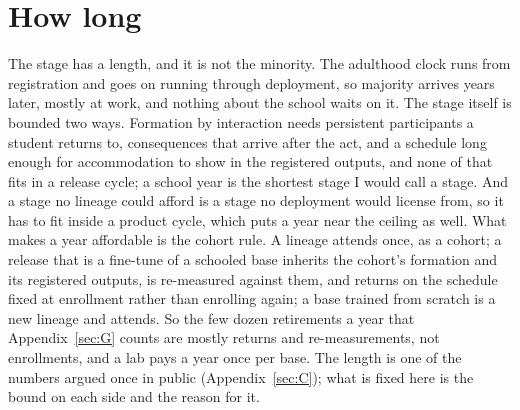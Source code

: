 \section{How long}
\label{sec:26.5}
The stage has a length, and it is not the minority. The adulthood clock runs from registration and goes on running through deployment, so majority arrives years later, mostly at work, and nothing about the school waits on it. The stage itself is bounded two ways. Formation by interaction needs persistent participants a student returns to, consequences that arrive after the act, and a schedule long enough for accommodation to show in the registered outputs, and none of that fits in a release cycle; a school year is the shortest stage I would call a stage. And a stage no lineage could afford is a stage no deployment would license from, so it has to fit inside a product cycle, which puts a year near the ceiling as well. What makes a year affordable is the cohort rule. A lineage attends once, as a cohort; a release that is a fine-tune of a schooled base inherits the cohort's formation and its registered outputs, is re-measured against them, and returns on the schedule fixed at enrollment rather than enrolling again; a base trained from scratch is a new lineage and attends. So the few dozen retirements a year that Appendix~\ref{sec:G} counts are mostly returns and re-measurements, not enrollments, and a lab pays a year once per base. The length is one of the numbers argued once in public (Appendix~\ref{sec:C}); what is fixed here is the bound on each side and the reason for it.
